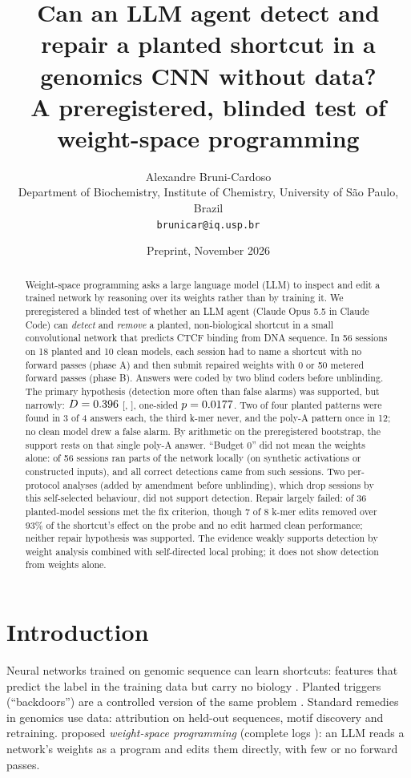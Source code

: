 \documentclass[11pt]{article}
\title{Can an LLM agent detect and repair a planted shortcut in a genomics CNN without data?\\
\large A preregistered, blinded test of weight-space programming}
\author{Alexandre Bruni-Cardoso\\\small Department of Biochemistry, Institute of Chemistry, University of S\~ao Paulo, Brazil\\\small\texttt{brunicar@iq.usp.br}}
\date{Preprint, November 2026}
\begin{document}
\maketitle

\begin{abstract}
\noindent
Weight-space programming asks a large language model (LLM) to inspect and edit a trained network by reasoning over
its weights rather than by training it. We preregistered a blinded test of whether an LLM agent (Claude Opus 5.5 in
Claude Code) can \emph{detect} and \emph{remove} a planted, non-biological shortcut in a small convolutional network
that predicts CTCF binding from DNA sequence. In 56 sessions on 18 planted and 10 clean models, each session had to
name a shortcut with no forward passes (phase A) and then submit repaired weights with 0 or 50 metered forward
passes (phase B). Answers were coded by two blind coders before unblinding. The primary hypothesis (detection more
often than false alarms) was supported, but narrowly: $D = 0.396$ [\HoneLo, \HoneHi], one-sided $p = 0.0177$. Two of
four planted patterns were found in 3 of 4 answers each, the third k-mer never, and the poly-A pattern once in 12;
no clean model drew a false alarm. By arithmetic on the preregistered bootstrap, the support rests on that single
poly-A answer. ``Budget 0'' did not mean the weights alone: \LocalAll{} of 56 sessions ran parts of the network
locally (on synthetic activations or constructed inputs), and all \NCorrect{} correct detections came from such sessions. Two per-protocol analyses
(added by amendment before unblinding), which drop sessions by this self-selected behaviour, did not support
detection. Repair
largely failed: \NFixed{} of 36 planted-model sessions met the fix criterion, though 7 of 8 k-mer edits removed over 93\% of the shortcut's effect on the
probe and no edit harmed clean performance;
neither repair hypothesis was supported. The evidence weakly supports detection by weight analysis combined with
self-directed local probing; it does not show detection from weights alone.
\end{abstract}

\section{Introduction}
Neural networks trained on genomic sequence can learn shortcuts: features that predict the label in the training
data but carry no biology \citep{geirhos2020shortcut}. Planted triggers (``backdoors'') are a controlled version of
the same problem \citep{gu2017badnets}. Standard remedies in genomics use data: attribution on held-out sequences,
motif discovery \citep{shrikumar2018modisco,modiscolite} and retraining. \citet{takehi2026wsp} proposed \emph{weight-space
programming} (complete logs \citep{takehi2026logs}): an LLM reads a network's weights as a program and edits them directly, with few or no forward passes.
\end{document}
